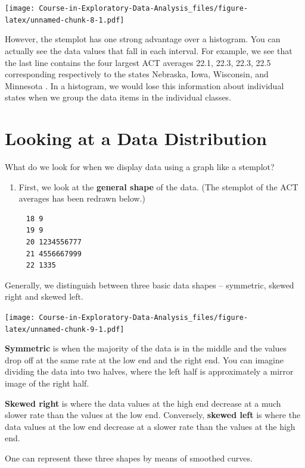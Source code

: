 \documentclass[
]{book}
\providecommand{\tightlist}{%
  \setlength{\itemsep}{0pt}\setlength{\parskip}{0pt}}
\begin{document}
\texttt{[image: Course-in-Exploratory-Data-Analysis\_files/figure-latex/unnamed-chunk-8-1.pdf]}

However, the stemplot has one strong advantage over a histogram. You can actually see the data values that fall in each interval. For example, we see that the last line contains the four largest ACT averages 22.1, 22.3, 22.3, 22.5 corresponding respectively to the states Nebraska, Iowa, Wisconsin, and Minnesota . In a histogram, we would lose this information about individual states when we group the data items in the individual classes.

\hypertarget{looking-at-a-data-distribution}{%
\section{Looking at a Data Distribution}\label{looking-at-a-data-distribution}}

What do we look for when we display data using a graph like a stemplot?

\begin{enumerate}
\def\labelenumi{\arabic{enumi}.}
\tightlist
\item
  First, we look at the \textbf{general shape} of the data. (The stemplot of the ACT averages has been redrawn below.)
\end{enumerate}

\begin{verbatim}
     18 9
     19 9
     20 1234556777
     21 4556667999
     22 1335
\end{verbatim}

Generally, we distinguish between three basic data shapes -- symmetric, skewed right and skewed left.

\texttt{[image: Course-in-Exploratory-Data-Analysis\_files/figure-latex/unnamed-chunk-9-1.pdf]}

\textbf{Symmetric} is when the majority of the data is in the middle and the values drop off at the same rate at the low end and the right end. You can imagine dividing the data into two halves, where the left half is approximately a mirror image of the right half.

\textbf{Skewed right} is where the data values at the high end decrease at a much slower rate than the values at the low end. Conversely, \textbf{skewed left} is where the data values at the low end decrease at a slower rate than the values at the high end.

One can represent these three shapes by means of smoothed curves.
\end{document}
